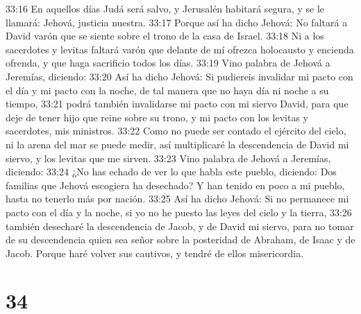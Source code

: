 33:16 En aquellos días Judá será salvo, y Jerusalén habitará segura, y se le llamará: Jehová, justicia nuestra. 
33:17 Porque así ha dicho Jehová: No faltará a David varón que se siente sobre el trono de la casa de Israel. 
33:18 Ni a los sacerdotes y levitas faltará varón que delante de mí ofrezca holocausto y encienda ofrenda, y que haga sacrificio todos los días. 
33:19 Vino palabra de Jehová a Jeremías, diciendo:  
33:20 Así ha dicho Jehová: Si pudiereis invalidar mi pacto con el día y mi pacto con la noche, de tal manera que no haya día ni noche a su tiempo,  
33:21 podrá también invalidarse mi pacto con mi siervo David, para que deje de tener hijo que reine sobre su trono, y mi pacto con los levitas y sacerdotes, mis ministros.  
33:22 Como no puede ser contado el ejército del cielo, ni la arena del mar se puede medir, así multiplicaré la descendencia de David mi siervo, y los levitas que me sirven.  
33:23 Vino palabra de Jehová a Jeremías, diciendo:  
33:24 ¿No has echado de ver lo que habla este pueblo, diciendo: Dos familias que Jehová escogiera ha desechado? Y han tenido en poco a mi pueblo, hasta no tenerlo más por nación.  
33:25 Así ha dicho Jehová: Si no permanece mi pacto con el día y la noche, si yo no he puesto las leyes del cielo y la tierra,  
33:26 también desecharé la descendencia de Jacob, y de David mi siervo, para no tomar de su descendencia quien sea señor sobre la posteridad de Abraham, de Isaac y de Jacob. Porque haré volver sus cautivos, y tendré de ellos misericordia.  

\chapter{34}

